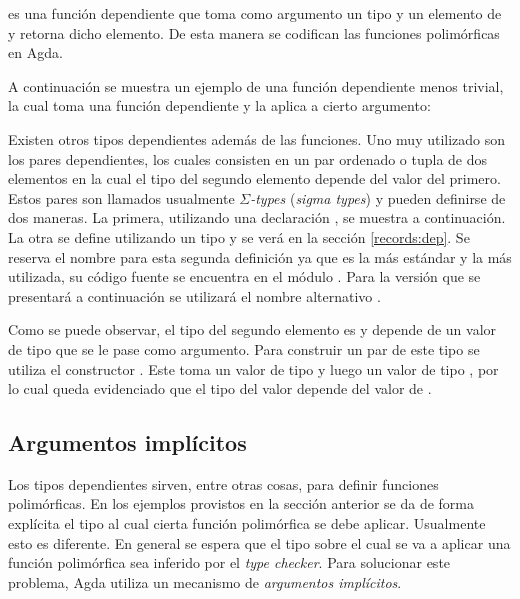 
 es una función dependiente que toma como argumento un tipo  y un elemento de  y retorna dicho elemento. De esta manera se codifican las funciones polimórficas en Agda. 

A continuación se muestra un ejemplo de una función dependiente menos trivial, la cual toma una función dependiente y la aplica a cierto argumento:


Existen otros tipos dependientes además de las funciones. Uno muy utilizado son los pares dependientes, los cuales consisten en un par ordenado o tupla de dos elementos en la cual el tipo del segundo elemento depende del valor del primero. Estos pares son llamados usualmente \textit{$\Sigma$-types} (\textit{sigma types}) y pueden definirse de dos maneras. La primera, utilizando una declaración , se muestra a continuación. La otra se define utilizando un tipo  y se verá en la sección \ref{records:dep}. Se reserva el nombre \AgdaRecord{$\Sigma$} para esta segunda definición ya que es la más estándar y la más utilizada, su código fuente se encuentra en el módulo \href{https://agda.github.io/agda-stdlib/Agda.Builtin.Sigma.html}{}. Para la versión que se presentará a continuación se utilizará el nombre alternativo .


Como se puede observar, el tipo del segundo elemento es  y depende de un valor de tipo  que se le pase como argumento. Para construir un par de este tipo se utiliza el constructor \AgdaInductiveConstructor{$\_$,$\_$}. Este toma un valor  de tipo  y luego un valor  de tipo , por lo cual queda evidenciado que el tipo del valor  depende del valor de .

\subsection{Argumentos implícitos}\label{dependent:implicit}

Los tipos dependientes sirven, entre otras cosas, para definir funciones polimórficas. En los ejemplos provistos en la sección anterior se da de forma explícita el tipo al cual cierta función polimórfica se debe aplicar. Usualmente esto es diferente. En general se espera que el tipo sobre el cual se va a aplicar una función polimórfica sea inferido por el \textit{type checker}. Para solucionar este problema, Agda utiliza un mecanismo de \textit{argumentos implícitos}. 


